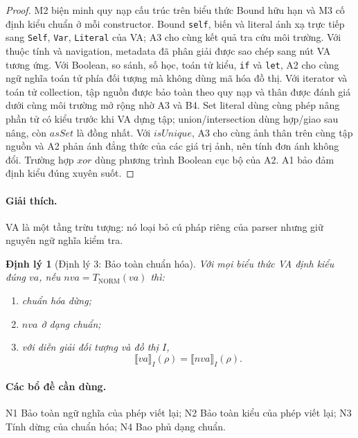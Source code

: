 \documentclass[11pt,a4paper]{article}
\newtheorem{theorem}{Định lý}
\theoremstyle{definition}
\newcommand{\sem}[2]{\llbracket #1 \rrbracket_{#2}}
\begin{document}
\begin{proof}
M2 biện minh quy nạp cấu trúc trên biểu thức Bound hữu hạn và M3 cố định kiểu
chuẩn ở mỗi constructor. Bound \texttt{self}, biến và literal ánh xạ trực tiếp
sang \texttt{Self}, \texttt{Var}, \texttt{Literal} của VA; A3 cho cùng kết quả
tra cứu môi trường. Với thuộc tính và navigation, metadata đã phân giải được
sao chép sang nút VA tương ứng. Với Boolean, so sánh, số học, toán tử kiểu,
\texttt{if} và \texttt{let}, A2 cho cùng ngữ nghĩa toán tử phía đối tượng mà
không dùng mã hóa đồ thị. Với iterator và toán tử collection, tập nguồn được
bảo toàn theo quy nạp và thân được đánh giá dưới cùng môi trường mở rộng nhờ A3
và B4. Set literal dùng cùng phép nâng phần tử có kiểu trước khi VA dựng tập;
union/intersection dùng hợp/giao sau nâng, còn $asSet$ là đồng nhất. Với
$isUnique$, A3 cho cùng ảnh thân trên cùng tập nguồn và A2 phản ánh đẳng thức
của các giá trị ảnh, nên tính đơn ánh không đổi. Trường hợp $xor$ dùng phương
trình Boolean cục bộ của A2. A1 bảo đảm định kiểu đúng xuyên suốt.
\end{proof}

\paragraph{Giải thích.}
VA là một tầng trừu tượng: nó loại bỏ cú pháp riêng của parser nhưng giữ nguyên
ngữ nghĩa kiểm tra.

\begin{theorem}[Định lý 3: Bảo toàn chuẩn hóa]
Với mọi biểu thức VA định kiểu đúng $va$, nếu $nva=T_{\mathrm{NORM}}(va)$ thì:
\begin{enumerate}[label=(\roman*)]
  \item chuẩn hóa dừng;
  \item $nva$ ở dạng chuẩn;
  \item với diễn giải đối tượng và đồ thị $I$,
  \[
  \sem{va}{I}(\rho)=\sem{nva}{I}(\rho).
  \]
\end{enumerate}
\end{theorem}

\paragraph{Các bổ đề cần dùng.}
N1 Bảo toàn ngữ nghĩa của phép viết lại; N2 Bảo toàn kiểu của phép viết lại;
N3 Tính dừng của chuẩn hóa; N4 Bao phủ dạng chuẩn.
\end{document}

